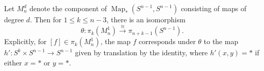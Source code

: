 Let $M_n^d$ denote the component of $\operatorname{Map}_*(S^{n-1}, S^{n-1})$ consisting of maps of degree $d$. Then for $1 \leq k \leq n-3$, there is an isomorphism
$$\theta: \pi_k(M_n^1) \xrightarrow{\cong} \pi_{n+k-1}(S^{n-1}).$$
Explicitly, for $[f] \in \pi_k(M_n^1)$, the map $f$ corresponds under $\theta$ to the map $h': S^k \times S^{n-1} \to S^{n-1}$ given by translation by the identity, where $h'(x, y) = *$ if either $x = *$ or $y = *$.
